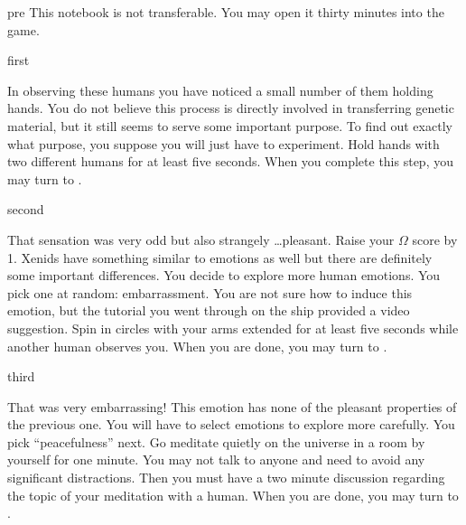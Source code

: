 \documentclass[notebook]{guildcamp1}
\begin{document}
\startnotebook{\nBrainDamage{}}

\begin{page}{pre}
This notebook is not transferable. You may open it thirty minutes into the game.
\end{page}

\begin{page}{first}

In observing these humans you have noticed a small number of them holding hands. You do not believe this process is directly involved in transferring genetic material, but it still seems to serve some important purpose. To find out exactly what purpose, you suppose you will just have to experiment. Hold hands with two different humans for at least five seconds. When you complete this step, you may turn to .

\end{page}

\begin{page}{second}

That sensation was very odd but also strangely \ldots pleasant. Raise your $\Omega$ score by 1. Xenids have something similar to emotions as well but there are definitely some important differences. You decide to explore more human emotions. You pick one at random: embarrassment. You are not sure how to induce this emotion, but the tutorial you went through on the ship provided a video suggestion. Spin in circles with your arms extended for at least five seconds while another human observes you. When you are done, you may turn to .

\end{page}

\begin{page}{third}

That was very embarrassing! This emotion has none of the pleasant properties of the previous one. You will have to select emotions to explore more carefully. You pick ``peacefulness'' next. Go meditate quietly on the universe in a room by yourself for one minute. You may not talk to anyone and need to avoid any significant distractions. Then you must have a two minute discussion regarding the topic of your meditation with a human. When you are done, you may turn to .

\end{page}
\end{document}
